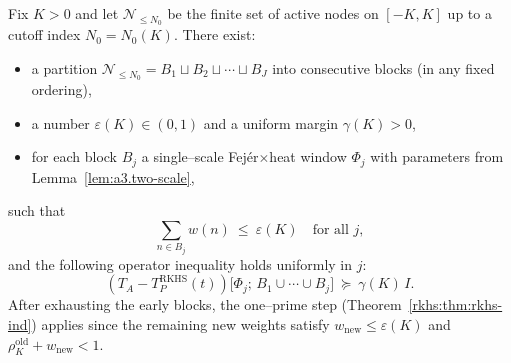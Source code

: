 \begin{theorem}\label{md:thm:ind-block-early}
Fix $K>0$ and let $\mathcal N_{\le N_0}$ be the finite set of active nodes on $[-K,K]$ up to a cutoff index $N_0=N_0(K)$. There exist:
\begin{itemize}
  \item a partition $\mathcal N_{\le N_0}=B_1\sqcup B_2\sqcup\cdots\sqcup B_J$ into consecutive blocks (in any fixed ordering),
  \item a number $\varepsilon(K)\in(0,1)$ and a uniform margin $\gamma(K)>0$,
  \item for each block $B_j$ a single--scale Fej\'er$\times$heat window $\Phi_j$ with parameters from Lemma~\ref{lem:a3.two-scale},
\end{itemize}
such that
\begin{equation}\label{eq:MD_2_3_base_interval-formula-5}
 \sum_{n\in B_j} w(n)\ \le\ \varepsilon(K)\quad\text{for all }j,
\end{equation}
and the following operator inequality holds uniformly in $j$:
\begin{equation}\label{md:eq:block-claim}
 (T_A-T_P^{\mathrm{RKHS}}(t))\bigl[\Phi_j;\, B_1\cup\cdots\cup B_j\bigr]\ \succeq\ \gamma(K)\,I.
\end{equation}
After exhausting the early blocks, the one--prime step (Theorem~\ref{rkhs:thm:rkhs-ind}) applies since the remaining new weights satisfy $w_{\mathrm{new}}\le\varepsilon(K)$ and $\rho_K^{\mathrm{old}}+w_{\mathrm{new}}<1$.
\end{theorem}
